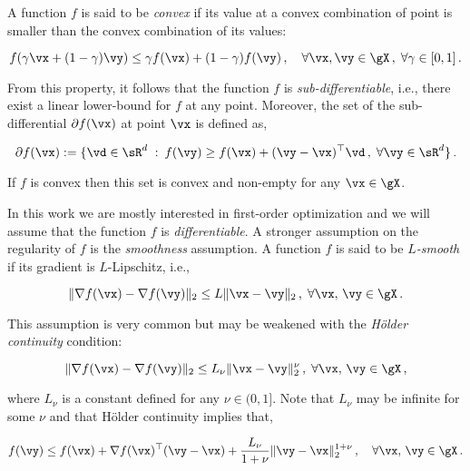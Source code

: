 A function $f$ is said to be \emph{convex} if its value at a convex combination of point is smaller than the convex combination of its values:

\begin{equation}
f(\gamma \vx + (1-\gamma) \vy) \leq \gamma f(\vx) + (1-\gamma) f(\vy)
\,, \quad \forall \vx, \vy \in \gX \,, \; \forall \gamma \in [0,1] \,.
\end{equation}

From this property, it follows that the function $f$ is \emph{sub-differentiable}, i.e., there exist a linear lower-bound for $f$ at any point. Moreover, the set of the sub-differential $\partial f(\vx)$ at point $\vx$ is defined as,

\begin{equation}
\partial f(\vx) := \{\vd \in \sR^d \;:\: f(\vy) \geq f(\vx) + (\vy- \vx)^\top \vd \, , \; \forall \vy \in \sR^d\} \,.
\end{equation}

If $f$ is convex then this set is convex and non-empty for any $\vx \in \gX$.

In this work we are mostly interested in first-order optimization and we will assume that the function $f$ is \emph{differentiable}. A stronger assumption on the regularity of $f$ is the \emph{smoothness} assumption. A function $f$ is said to be \emph{$L$-smooth} if its gradient is $L$-Lipschitz, i.e.,

\begin{equation}
\|\nabla f(\vx) - \nabla f(\vy) \|_2 \leq L \|\vx- \vy\|_2 \, , \; \forall \vx , \,\vy \in \gX \,.
\end{equation}

This assumption is very common but may be weakened with the \emph{Hölder continuity} condition:

\begin{equation}
\|\nabla f(\vx) - \nabla f(\vy) \|_2 \leq L_{\nu} \|\vx- \vy\|_2^{\nu} \, , \; \forall \vx , \,\vy \in \gX \,,
\end{equation}

where $L_{\nu}$ is a constant defined for any $\nu \in (0,1]$. Note that $L_{\nu}$ may be infinite for some $\nu$ and that Hölder continuity implies that,

\begin{equation}
f(\vy) \leq f(\vx) + \nabla f(\vx)^\top (\vy - \vx) + \frac{L_{\nu}}{1+\nu}\|\vy - \vx\|_2^{1+\nu} \,, \quad \forall \vx,\,\vy \in \gX \,.
\end{equation}













